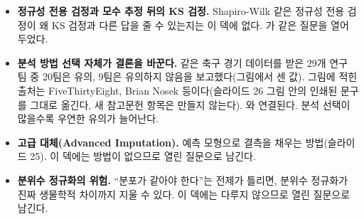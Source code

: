 \begin{itemize}
  \item \textbf{정규성 전용 검정과 모수 추정 뒤의 KS 검정.} Shapiro-Wilk
        같은 정규성 전용 검정이 왜 KS 검정과 다른 답을 줄 수 있는지는
        이 덱에 없다. 가 같은 질문을 열어 두었다.
  \item \textbf{분석 방법 선택 자체가 결론을 바꾼다.} 같은 축구 경기
        데이터를 받은 29개 연구 팀 중 20팀은 유의, 9팀은 유의하지
        않음을 보고했다(그림에서 센 값). 그림에 적힌 출처는
        FiveThirtyEight, Brian Nosek 등이다(슬라이드 26 그림 안의
        인쇄된 문구를 그대로 옮긴다, 새 참고문헌 항목은 만들지 않는다).
        와 연결된다. 분석 선택이 많을수록 우연한
        유의가 늘어난다.
  \item \textbf{고급 대체(Advanced Imputation).} 예측 모형으로 결측을
        채우는 방법(슬라이드 25). 이 덱에는 방법이 없으므로 열린
        질문으로 남긴다.
  \item \textbf{분위수 정규화의 위험.} ``분포가 같아야 한다''는 전제가
        틀리면, 분위수 정규화가 진짜 생물학적 차이까지 지울 수 있다.
        이 덱에는 다루지 않으므로 열린 질문으로 남긴다.
\end{itemize}
